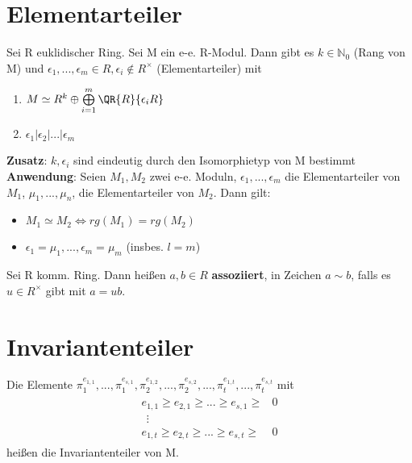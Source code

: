 \section{Elementarteiler}
Sei R euklidischer Ring. Sei M ein e-e. R-Modul. Dann gibt es $k \in \mathbb{N}_0$ (Rang von M) und $\epsilon_1,...,\epsilon_m \in R, \epsilon_i \notin R^\times$ (Elementarteiler) mit
\begin{enumerate}
	\item $M \simeq R^k \oplus \bigoplus \limits_{i=1}^m \QR{R}{\epsilon_i R}$
	\item $\epsilon_1 | \epsilon_2 | ... | \epsilon_m$
\end{enumerate}
\textbf{Zusatz}: $k,\epsilon_i$ sind eindeutig durch den Isomorphietyp von M bestimmt\\
\textbf{Anwendung}: Seien $M_1,M_2$ zwei e-e. Moduln, $\epsilon_1,...,\epsilon_m$ die Elementarteiler von $M_1$, $\mu_1,...,\mu_n$, die Elementarteiler von $M_2$. Dann gilt:
\begin{itemize}
	\item $M_1 \simeq M_2 \Leftrightarrow rg(M_1) = rg(M_2)$
	\item $\epsilon_1 = \mu_1,...,\epsilon_m = \mu_m$ (insbes. $l=m$) %
\end{itemize}
\begin{remark}
Sei R komm. Ring. Dann heißen $a,b \in R$ \textbf{assoziiert}, in Zeichen $a \sim b$, falls es $u \in R^\times$ gibt mit $a=ub$.
\end{remark}

\section{Invariantenteiler}
\begin{definition}
Die Elemente $\pi_1^{e_{1,1}},...,\pi_1^{e_{s,1}},\pi_2^{e_{1,2}},...,\pi_2^{e_{s,2}},...,\pi_t^{e_{1,t}},...,\pi_t^{e_{s,t}}$ mit 
\begin{align*}
\begin{array}{ll}
e_{1,1} \geq e_{2,1} \geq ... \geq e_{s,1} \geq & 0 \\ 
~~\vdots & \\ 
e_{1,t} \geq e_{2,t} \geq ... \geq e_{s,t} \geq & 0
\end{array} 
\end{align*}
heißen die Invariantenteiler von M.
\end{definition}
